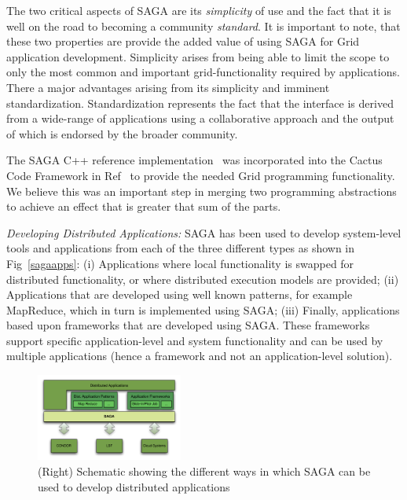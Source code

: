 \documentclass[conference,final]{IEEEtran}
\begin{document}
The two critical aspects of SAGA are its {\it simplicity} of use and
the fact that it is well on the road to becoming a community {\it
  standard}.  It is important to note, that these two properties are
provide the added value of using SAGA for Grid application
development.  Simplicity arises from being able to limit the scope to
only the most common and important grid-functionality required by
applications.  There a major advantages arising from its simplicity
and imminent standardization.  Standardization represents the fact
that the interface is derived from a wide-range of applications using
a collaborative approach and the output of which is endorsed by the
broader community.

The SAGA C++ reference implementation~\cite{saga_web} was incorporated
into the Cactus Code Framework in Ref~\cite{escience07} to provide the
needed Grid programming functionality.  We believe this was an
important step in merging two programming abstractions to achieve an
effect that is greater that sum of the parts. 




{\it Developing Distributed Applications: }SAGA has been used to develop system-level tools and applications from
each of the three different types as shown in Fig~\ref{sagaapps}: (i)
Applications where local functionality is swapped for distributed
functionality, or where distributed execution models are provided;
(ii) Applications that are developed using well known patterns, for
example MapReduce, which in turn is implemented using SAGA; (iii)
Finally, applications based upon frameworks that are developed using
SAGA. These frameworks support specific application-level and system
functionality and can be used by multiple applications (hence a
framework and not an application-level solution).


\begin{figure}[!ht]
  \begin{center}
\includegraphics[width=0.43\textwidth]{saga_platform_figures.pdf}
\end{center}
  \caption{\small(Right) Schematic showing the different ways in which
    SAGA can be used to develop distributed applications}
 \label{sagapps}
\end{figure}
\end{document}
